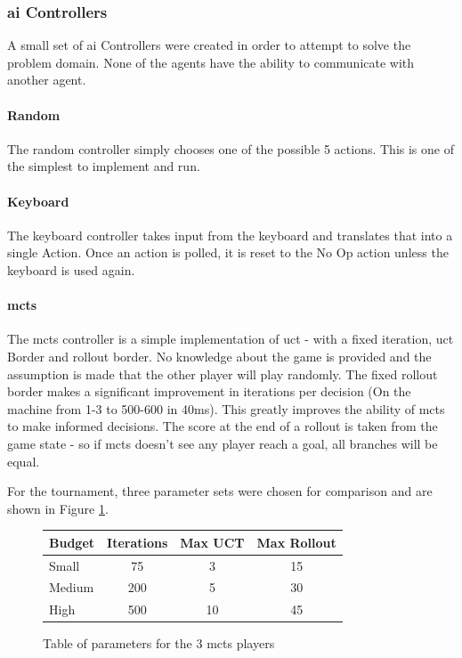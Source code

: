 \documentclass{IEEEtran}
\begin{document}
\subsubsection{\gls{ai} Controllers}
A small set of \gls{ai} Controllers were created in order to attempt to solve the problem domain. None of the agents have the ability to communicate with another agent.
\paragraph{Random}
The random controller simply chooses one of the possible 5 actions. This is one of the simplest to implement and run.
\paragraph{Keyboard}
The keyboard controller takes input from the keyboard and translates that into a single Action. Once an action is polled, it is reset to the No Op action unless the keyboard is used again. 
\paragraph{\gls{mcts}}
The \gls{mcts} controller is a simple implementation of \gls{uct} - with a fixed iteration, \gls{uct} Border and rollout border. No knowledge about the game is provided and the assumption is made that the other player will play randomly. The fixed rollout border makes a significant improvement in iterations per decision (On the machine from 1-3 to 500-600 in 40ms). This greatly improves the ability of \gls{mcts} to make informed decisions. The score at the end of a rollout is taken from the game state - so if \gls{mcts} doesn't see any player reach a goal, all branches will be equal.

For the tournament, three parameter sets were chosen for comparison and are shown in Figure \ref{mctsTable}.
\begin{figure}[h]
\centering
\begin{tabular}{| l | c | c | c |}
\hline
\textbf{Budget} & \textbf{Iterations} & \textbf{Max UCT} & \textbf{Max Rollout} \\
\hline
Small & 75 & 3 & 15 \\
Medium & 200 & 5 & 30 \\
High & 500 & 10 & 45 \\
\hline
\end{tabular}
\caption{Table of parameters for the 3 \gls{mcts} players}
\label{mctsTable}
\end{figure}
\end{document}

